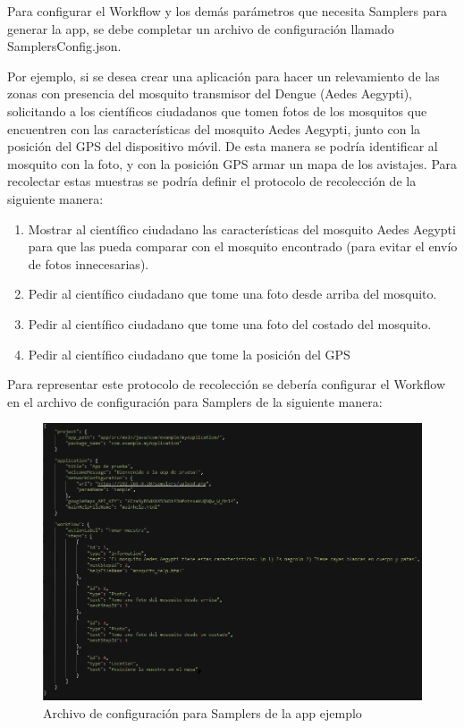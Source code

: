 Para configurar el Workflow y los demás parámetros que necesita Samplers para generar la app, se debe completar un archivo de configuración llamado SamplersConfig.json.

Por ejemplo, si se desea crear una aplicación para hacer un relevamiento de las zonas con presencia del mosquito transmisor del Dengue (Aedes Aegypti), solicitando a los científicos ciudadanos que tomen fotos de los mosquitos que encuentren con las características del mosquito Aedes Aegypti, junto con la posición del GPS del dispositivo móvil. De esta manera se podría identificar al mosquito con la foto, y con la posición GPS armar un mapa de los avistajes. Para recolectar estas muestras se podría definir el protocolo de recolección de la siguiente manera:

\begin{enumerate}

\item Mostrar al científico ciudadano las características del mosquito Aedes Aegypti para que las pueda comparar con el mosquito encontrado (para evitar el envío de fotos innecesarias).

\item Pedir al científico ciudadano que tome una foto desde arriba del mosquito.

\item Pedir al científico ciudadano que tome una foto del costado del mosquito.

\item Pedir al científico ciudadano que tome la posición del GPS

\end{enumerate}

Para representar este protocolo de recolección se debería configurar el Workflow en el archivo de configuración para Samplers de la siguiente manera: 

\begin{figure}[H]
  \centering
    \includegraphics[width=\textwidth]{05-implementacion/archivo_config_app_ejemplo.png} 
   \caption{Archivo de configuración para Samplers de la app ejemplo}
\end{figure}


